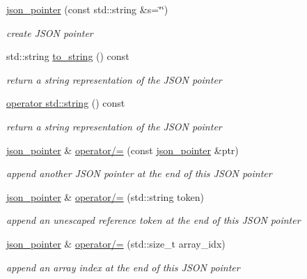 \begin{DoxyCompactItemize}
\item 
\hyperlink{classnlohmann_1_1json__pointer_a7f32d7c62841f0c4a6784cf741a6e4f8}{json\+\_\+pointer} (const std\+::string \&s=\char`\"{}\char`\"{})
\begin{DoxyCompactList}\small\item\em create J\+S\+ON pointer \end{DoxyCompactList}\item 
std\+::string \hyperlink{classnlohmann_1_1json__pointer_a3d4b15d32d096e3776c5d2c773b524f5}{to\+\_\+string} () const
\begin{DoxyCompactList}\small\item\em return a string representation of the J\+S\+ON pointer \end{DoxyCompactList}\item 
\hyperlink{classnlohmann_1_1json__pointer_ae9015c658f99cf3d48a8563accc79988}{operator std\+::string} () const
\begin{DoxyCompactList}\small\item\em return a string representation of the J\+S\+ON pointer \end{DoxyCompactList}\item 
\hyperlink{classnlohmann_1_1json__pointer}{json\+\_\+pointer} \& \hyperlink{classnlohmann_1_1json__pointer_a7395bd0af29ac23fd3f21543c935cdfa}{operator/=} (const \hyperlink{classnlohmann_1_1json__pointer}{json\+\_\+pointer} \&ptr)
\begin{DoxyCompactList}\small\item\em append another J\+S\+ON pointer at the end of this J\+S\+ON pointer \end{DoxyCompactList}\item 
\hyperlink{classnlohmann_1_1json__pointer}{json\+\_\+pointer} \& \hyperlink{classnlohmann_1_1json__pointer_abdd21567b2b1d69329af0f520335e68b}{operator/=} (std\+::string token)
\begin{DoxyCompactList}\small\item\em append an unescaped reference token at the end of this J\+S\+ON pointer \end{DoxyCompactList}\item 
\hyperlink{classnlohmann_1_1json__pointer}{json\+\_\+pointer} \& \hyperlink{classnlohmann_1_1json__pointer_a7de51480324eb1c5a89ed552cd699875}{operator/=} (std\+::size\+\_\+t array\+\_\+idx)
\begin{DoxyCompactList}\small\item\em append an array index at the end of this J\+S\+ON pointer \end{DoxyCompactList}\item 

\end{DoxyCompactItemize}
